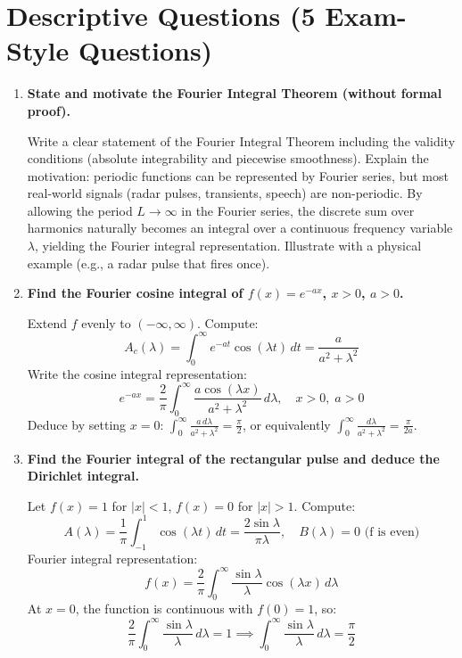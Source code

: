 \documentclass[12pt,a4paper]{article}
\begin{document}
\section{Descriptive Questions (5 Exam-Style Questions)}

\begin{enumerate}[label=\textbf{\arabic*.}]

\item \textbf{State and motivate the Fourier Integral Theorem (without formal proof).}

Write a clear statement of the Fourier Integral Theorem including the validity conditions (absolute integrability and piecewise smoothness). Explain the motivation: periodic functions can be represented by Fourier series, but most real-world signals (radar pulses, transients, speech) are non-periodic. By allowing the period $L\to\infty$ in the Fourier series, the discrete sum over harmonics naturally becomes an integral over a continuous frequency variable $\lambda$, yielding the Fourier integral representation. Illustrate with a physical example (e.g., a radar pulse that fires once).

\item \textbf{Find the Fourier cosine integral of $f(x)=e^{-ax}$, $x>0$, $a>0$.}

Extend $f$ evenly to $(-\infty,\infty)$. Compute:
\[
A_c(\lambda) = \int_0^\infty e^{-at}\cos(\lambda t)\,dt = \frac{a}{a^2+\lambda^2}
\]
Write the cosine integral representation:
\[
e^{-ax} = \frac{2}{\pi}\int_0^\infty \frac{a\cos(\lambda x)}{a^2+\lambda^2}\,d\lambda, \quad x>0,\; a>0
\]
Deduce by setting $x=0$: $\int_0^\infty\frac{a\,d\lambda}{a^2+\lambda^2} = \frac{\pi}{2}$, or equivalently $\int_0^\infty\frac{d\lambda}{a^2+\lambda^2} = \frac{\pi}{2a}$.

\item \textbf{Find the Fourier integral of the rectangular pulse and deduce the Dirichlet integral.}

Let $f(x)=1$ for $|x|<1$, $f(x)=0$ for $|x|>1$. Compute:
\[
A(\lambda) = \frac{1}{\pi}\int_{-1}^{1}\cos(\lambda t)\,dt = \frac{2\sin\lambda}{\pi\lambda}, \quad B(\lambda)=0 \text{ (f is even)}
\]
Fourier integral representation:
\[
f(x) = \frac{2}{\pi}\int_0^\infty \frac{\sin\lambda}{\lambda}\cos(\lambda x)\,d\lambda
\]
At $x=0$, the function is continuous with $f(0)=1$, so:
\[
\frac{2}{\pi}\int_0^\infty\frac{\sin\lambda}{\lambda}\,d\lambda = 1 \implies \int_0^\infty\frac{\sin\lambda}{\lambda}\,d\lambda = \frac{\pi}{2}
\]


\end{enumerate}
\end{document}
